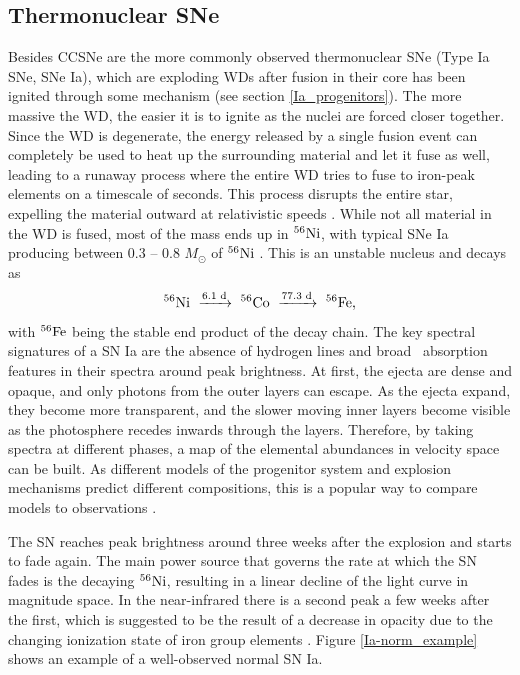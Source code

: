 \documentclass[a4paper,oneside,12pt, class=Latex/Classes/PhDthesisPSnPDF, crop=false]{standalone}
\begin{document}
\subsection{Thermonuclear SNe}
\label{SNIa}
Besides CCSNe are the more commonly observed thermonuclear SNe (Type Ia SNe, SNe Ia), which are exploding WDs after fusion in their core has been ignited through some mechanism (see section \ref{Ia_progenitors}). The more massive the WD, the easier it is to ignite as the nuclei are forced closer together. Since the WD is degenerate, the energy released by a single fusion event can completely be used to heat up the surrounding material and let it fuse as well, leading to a runaway process where the entire WD tries to fuse to iron-peak elements on a timescale of seconds. This process disrupts the entire star, expelling the material outward at relativistic speeds \citep{Ia_thermonuclear}. While not all material in the WD is fused, most of the mass ends up in $^{56}\text{Ni}$, with typical SNe Ia producing between 0.3 -- 0.8 $M_\odot$ of $^{56}\text{Ni}$ \citep{Ia_Ni56_yield}. This is an unstable nucleus and decays as
\begin{equation}
    \Nififtysix\ \xrightarrow{6.1\text{ d}}\ \Cofiftysix\ \xrightarrow{77.3\text{ d}}\ \Fefiftysix,
\end{equation}
with $^{56}\text{Fe}$ being the stable end product of the decay chain. The key spectral signatures of a SN Ia are the absence of hydrogen lines and broad \SiII\ absorption features in their spectra around peak brightness. At first, the ejecta are dense and opaque, and only photons from the outer layers can escape. As the ejecta expand, they become more transparent, and the slower moving inner layers become visible as the photosphere recedes inwards through the layers. Therefore, by taking spectra at different phases, a map of the elemental abundances in velocity space can be built. As different models of the progenitor system and explosion mechanisms predict different compositions, this is a popular way to compare models to observations \citep[e.g.][]{ptf11kx,de_2019_18byg,2020sck_Iax,2021rhu}.

The SN reaches peak brightness around three weeks after the explosion and starts to fade again. The main power source that governs the rate at which the SN fades is the decaying $^{56}\text{Ni}$, resulting in a linear decline of the light curve in magnitude space. In the near-infrared there is a second peak a few weeks after the first, which is suggested to be the result of a decrease in opacity due to the changing ionization state of iron group elements \citep{2nd_max}. Figure \ref{Ia-norm_example} shows an example of a well-observed normal SN Ia.
\end{document}
